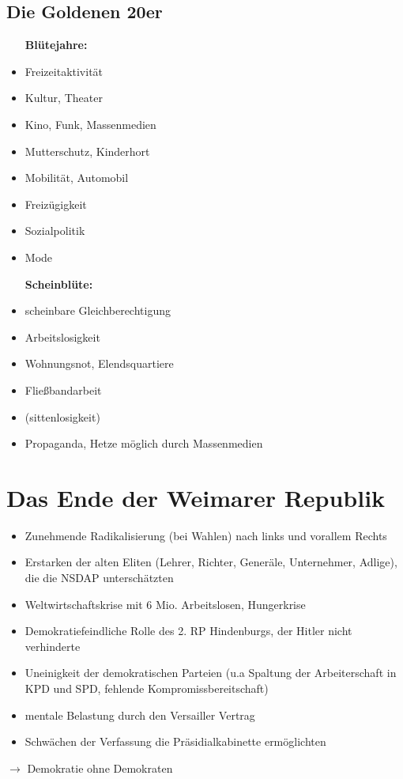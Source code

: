 \documentclass{article}
\begin{document}
\subsection*{Die Goldenen 20er}
\begin{minipage}[t]{.5\textwidth}
    \begin{itemize}
        \item [\textbf{Blütejahre:}]
        \item Freizeitaktivität
        \item Kultur, Theater
        \item Kino, Funk, Massenmedien
        \item Mutterschutz, Kinderhort
        \item Mobilität, Automobil
        \item Freizügigkeit
        \item Sozialpolitik
        \item Mode
    \end{itemize}
\end{minipage}%
\begin{minipage}[t]{.5\textwidth}
    \begin{itemize}
        \item [\textbf{Scheinblüte:}]
        \item scheinbare Gleichberechtigung
        \item Arbeitslosigkeit
        \item Wohnungsnot, Elendsquartiere
        \item Fließbandarbeit
        \item (sittenlosigkeit)
        \item Propaganda, Hetze möglich durch Massenmedien
    \end{itemize}
\end{minipage}%
\section*{Das Ende der Weimarer Republik}
\begin{itemize}
    \item Zunehmende Radikalisierung (bei Wahlen) nach links und vorallem Rechts
    \item Erstarken der alten Eliten (Lehrer, Richter, Generäle, Unternehmer, Adlige), die die NSDAP unterschätzten
    \item Weltwirtschaftskrise mit 6 Mio. Arbeitslosen, Hungerkrise
    \item Demokratiefeindliche Rolle des 2. RP Hindenburgs, der Hitler nicht verhinderte
    \item Uneinigkeit der demokratischen Parteien (u.a Spaltung der Arbeiterschaft in KPD und SPD, fehlende Kompromissbereitschaft)
    \item mentale Belastung durch den Versailler Vertrag
    \item Schwächen der Verfassung die Präsidialkabinette ermöglichten
\end{itemize}
$\rightarrow$ Demokratie ohne Demokraten
\end{document}
